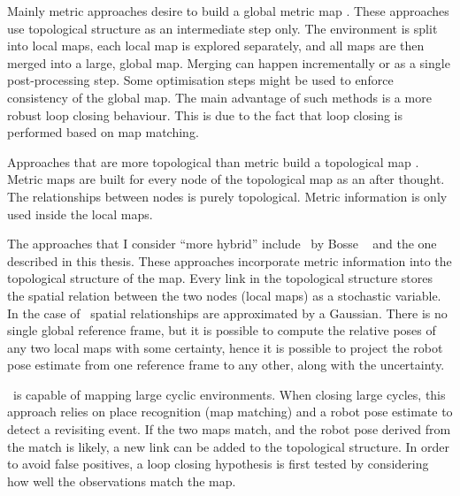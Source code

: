 Mainly metric approaches desire to build a global metric map
\cite{Thrun98a, slam_thrun98b}. These approaches use topological
structure as an intermediate step only. The environment is split into
local maps, each local map is explored separately, and all maps are
then merged into a large, global map. Merging can happen incrementally
or as a single post-processing step. Some optimisation steps might be
used to enforce consistency of the global map. The main advantage of
such methods is a more robust loop closing behaviour. This is due to
the fact that loop closing is performed based on map matching.

Approaches that are more topological than metric build a topological
map \cite{Cho01,Kuipers00}. Metric maps are built for every node of
the topological map as an after thought. The relationships between
nodes is purely topological. Metric information is only used inside
the local maps.

The approaches that I consider ``more hybrid'' include \Atlas\ by
Bosse \etal\ \cite{bosse03atlas} and the one described in this thesis.
These approaches incorporate metric information into the topological
structure of the map. Every link in the topological structure stores
the spatial relation between the two nodes (local maps) as a
stochastic variable. In the case of \Atlas\ spatial relationships are
approximated by a Gaussian. There is no single global reference
frame, but it is possible to compute the relative poses of any two
local maps with some certainty, hence it is possible to project the
robot pose estimate from one reference frame to any other, along with
the uncertainty.

\Atlas\ is capable of mapping large cyclic environments. When closing
large cycles, this approach relies on place recognition (map matching)
and a robot pose estimate to detect a revisiting event. If the two
maps match, and the robot pose derived from the match is likely, a new
link can be added to the topological structure. In order to avoid
false positives, a loop closing hypothesis is first tested by
considering how well the observations match the map.


\nocite{tim_bailey,
thrun00,
dissanayake01,
SOG-Slam01,
guivant02:_simul,
guivant02:_solvin,
thrun02:_robot_mappin,
 zunino01:_simul,
 JensfeltKristensen01,
 JensfeltWijkAustin00a,
 JensfeltAustinWijk00b,
 anguelov02,
 hahnel02:_map,
 burgard99:_exper,
 schulz01:_track_multip_movin_objec_mobil_robot,
 castellanos99:_spmap,
 castellanos01:_multis,
 dudek00:_robus_place_recog_local_appear_method,
 konolige99:_increm_mappin_large_cyclic_envir,
 lu97:_global,
 gutmann96:_amos,
 williams:icra2002,
 williams:acra2001,
 Zimmer96,
 slam_kuiper91,
 slam_kuipers88,
 Thrun00j,
 Fox99,
 Cox91,
 Borenstein96,
 kk2002,
 sidenbladh00stochastic,
 Cox94,
 Thrun02h,
 Bennewitz02a,
 Liu01a,
 Dellaert00c,
 nieto2003, 
 konolige99,
 doucetraoblackwellised,
 guivant04,
 newman03,
 vandermerwe00_tr,
 vandermerwe2000,
 wan01unscented,
 unscented,
 Margaret_hybrid_maps,
 kuipers1978,
 KuipersLevitt88,
 Kuipers00,
 Buzan04,
 uhlmann97nondivergent,
 julier97new,
 julier96general,
 julier99scaled,
 doucet98sequential,
 DA_Lazy,
 Kuipers2004,
 kk2004}



